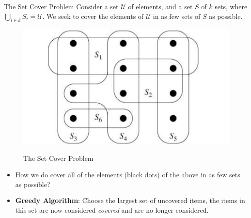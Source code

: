\documentclass[final]{beamer}
\newlength{\colwidth}
\begin{document}
\begin{frame}[t]
\begin{columns}[t]
\begin{column}{\colwidth}
\begin{block}{The Set Cover Problem}
  Consider a set $\mathcal{U}$ of elements, and a set $S$ of $k$ sets, where
  $\bigcup_{i \in k}S_i = \mathcal{U}$. We seek to cover the elements of $\mathcal{U}$ in as few
  sets of $S$ as possible.
    \begin{figure}
      \includegraphics[width=0.5\colwidth]{figures/set_cover.png}
      \label{fig:library}
      \caption{The Set Cover Problem}
    \end{figure}
    \begin{itemize}
      \item How we do cover all of the elements (black dots) of the above in as few sets as possible?
      \item \textbf{Greedy Algorithm}: Choose the largest set of uncovered items, the items in this set are now considered \emph{covered} and are no longer considered.
    \end{itemize}
\end{block}


\end{column}
\end{columns}
\end{frame}
\end{document}

